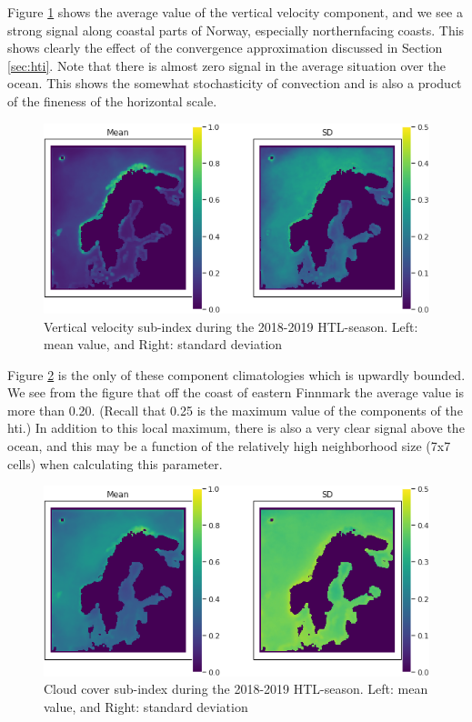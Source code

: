 Figure \ref{fig:upwardvelocitymeps} shows the average value of the vertical velocity component, and we see a strong signal along coastal parts of Norway, especially northernfacing coasts. This shows clearly the effect of the convergence approximation discussed in Section \ref{sec:hti}. Note that there is almost zero signal in the average situation over the ocean. This shows the somewhat stochasticity of convection and is also a product of the fineness of the horizontal scale. 

\begin{figure}
    \centering
    \includegraphics[width = \textwidth]{Figures/W.png}
    \caption{Vertical velocity sub-index during the 2018-2019 HTL-season. Left: mean value, and Right: standard deviation}
    \label{fig:upwardvelocitymeps}
\end{figure}

Figure \ref{fig:cloudcovermeps} is the only of these component climatologies which is upwardly bounded. We see from the figure that off the coast of eastern Finnmark the average value is more than 0.20. (Recall that 0.25 is the maximum value of the components of the \acrshort{hti}.) In addition to this local maximum, there is also a very clear signal above the ocean, and this may be a function of the relatively high neighborhood size (7x7 cells) when calculating this parameter. 

\begin{figure}
    \centering
    \includegraphics[width = \textwidth]{Figures/C.png}
    \caption{Cloud cover sub-index during the 2018-2019 HTL-season. Left: mean value, and Right: standard deviation}
    \label{fig:cloudcovermeps}
\end{figure}



